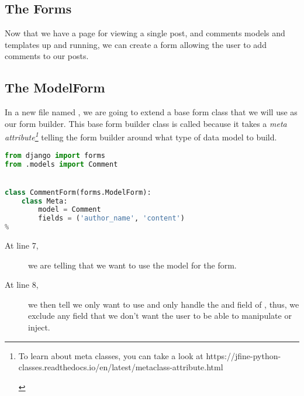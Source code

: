 \subsection{The Forms}
    \label{sec:the-forms}
    Now that we have a page for viewing a single post, 
    and comments models and templates up and running,
    we can create a form allowing the user to add comments to our posts.
    
    \subsection{The ModelForm}
        In a new file named , we are going to extend a base
        form class that we will use as our form builder. This base form builder
        class is called  because it takes a 
        \emph{
            meta attribute\footnote{
                \raggedright
                To learn about meta classes, you can take a look at
                https://jfine-python-classes.readthedocs.io/en/latest/metaclass-attribute.html
                \begin{center}
                \end{center}
            }}
        telling the form builder around what type of data model to build.
        
        \begin{lstlisting}[language=python, title=blog/forms.py]
from django import forms
from .models import Comment


class CommentForm(forms.ModelForm):
    class Meta:
        model = Comment
        fields = ('author_name', 'content')
%
        \end{lstlisting}
        
        \begin{description}
            \item[At line 7,] we are telling that we want to use the  
                model for the form.
            \item[At line 8,] we then tell we only want to use and only handle the
                 and  field of ,
                thus, we exclude any field that we don't want the user to be able to manipulate or inject.
        \end{description}
        
